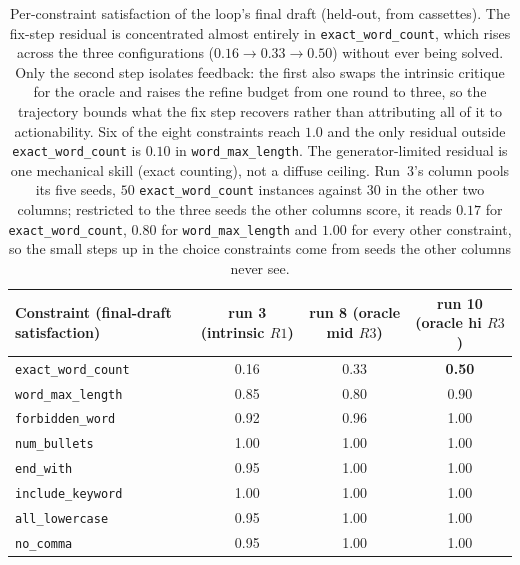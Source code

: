 \documentclass[11pt]{article}
\begin{document}
\begin{table}[h]
\centering
\small
\setlength{\tabcolsep}{5pt}
\begin{tabular}{lccc}
\toprule
Constraint (final-draft satisfaction) & run 3 (intrinsic $R1$) & run 8 (oracle mid $R3$) & run 10 (oracle hi $R3$) \\
\midrule
\texttt{exact\_word\_count}  & 0.16 & 0.33 & \textbf{0.50} \\
\texttt{word\_max\_length}   & 0.85 & 0.80 & 0.90 \\
\texttt{forbidden\_word}     & 0.92 & 0.96 & 1.00 \\
\texttt{num\_bullets}        & 1.00 & 1.00 & 1.00 \\
\texttt{end\_with}           & 0.95 & 1.00 & 1.00 \\
\texttt{include\_keyword}    & 1.00 & 1.00 & 1.00 \\
\texttt{all\_lowercase}      & 0.95 & 1.00 & 1.00 \\
\texttt{no\_comma}           & 0.95 & 1.00 & 1.00 \\
\bottomrule
\end{tabular}
\caption{Per-constraint satisfaction of the loop's final draft (held-out, from
cassettes). The fix-step residual is concentrated almost entirely in
\texttt{exact\_word\_count}, which rises across the three configurations
($0.16\!\to\!0.33\!\to\!0.50$) without ever being solved. Only the second step isolates
feedback: the first also swaps the intrinsic critique for the oracle and raises the refine budget
from one round to three, so the trajectory bounds what the fix step recovers rather than
attributing all of it to actionability. Six of the eight constraints reach $1.0$ and the only
residual outside \texttt{exact\_word\_count} is $0.10$ in \texttt{word\_max\_length}. The generator-limited
residual is one mechanical skill (exact counting), not a diffuse ceiling. Run~3's column pools its
five seeds, $50$ \texttt{exact\_word\_count} instances against $30$ in the other two columns;
restricted to the three seeds the other columns score, it reads $0.17$ for
\texttt{exact\_word\_count}, $0.80$ for \texttt{word\_max\_length} and $1.00$ for every other
constraint, so the small steps up in the choice constraints come from seeds the other columns
never see.}
\label{tab:residual}
\end{table}
\end{document}
